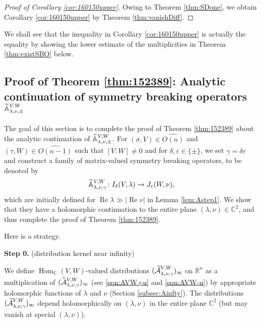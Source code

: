 \begin{proof}
[Proof of Corollary \ref{cor:160150upper}]
Owing to Theorem \ref{thm:SDone}, 
 we obtain Corollary \ref{cor:160150upper} by 
 Theorem \ref{thm:vanishDiff}.  
\end{proof}

We shall see 
 that the inequality in Corollary \ref{cor:160150upper}
 is actually the equality 
 by showing the lower estimate
 of the multiplicities in Theorem \ref{thm:existSBO}
 below.  
\subsection{Proof of Theorem \ref{thm:152389}: Analytic continuation of 
symmetry breaking operators
 ${\widetilde{\mathbb{A}}}_{{\lambda},{\nu},{\pm}}^{{V, W}}$}
\label{subsec:holoAVW}
The goal of this section
 is to complete the proof of Theorem \ref{thm:152389}
 about the analytic continuation of ${\widetilde{\mathbb{A}}}_{{\lambda},{\nu},{\pm}}^{{V,W}}$.  
For $(\sigma,V) \in \widehat {O(n)}$ and 
 $(\tau,W) \in \widehat{O(n-1)}$ such that $[V:W]\ne 0$
 and for $\delta, \varepsilon \in \{\pm\}$, 
 we set $\gamma =\delta \varepsilon$
 and construct a family
 of matrix-valued symmetry breaking operators,
 to be denoted by
\[
  {\widetilde{\mathbb{A}}}_{{\lambda},{\nu},{\gamma}}^{{V, W}} \colon
  I_{\delta}(V,\lambda) \to J_{\varepsilon}(W,\nu), 
\]
 which are initially defined
 for $\operatorname{Re} \lambda \gg |\operatorname{Re} \nu|$
 in Lemma \ref{lem:Astep1}.  
We show that they have a holomorphic continuation 
 to the entire plane $(\lambda, \nu) \in {\mathbb{C}}^2$, 
 and thus complete the proof of Theorem \ref{thm:152389}.  


\vskip 0.8pc
Here is a strategy.  
\par\noindent
{\bf{Step 0.}}
(distribution kernel near infinity)\enspace

We define ${\operatorname{Hom}}_{\mathbb{C}}(V,W)$-valued distributions
 $(\widetilde{{\mathcal{A}}}_{{\lambda},{\nu},{\gamma}}^{{V, W}})_{\infty}$
 on ${\mathbb{R}}^n$ as a multiplication 
 of $(\tilde{\tilde{{\mathcal{A}}}}_{{\lambda},{\nu},{\gamma}}^{{V, W}})_{\infty}$
 (see \eqref{eqn:AVW+u} and \eqref{eqn:AVW-u})
 by appropriate holomorphic functions
 of $\lambda$ and $\nu$
 (Section \ref{subsec:Ainfty}).  
The distributions $(\widetilde{{\mathcal{A}}}_{{\lambda},{\nu},{\gamma}}^{{V,W}})_{\infty}$ depend holomorphically
 on $(\lambda,\nu)$ in the entire plane ${\mathbb{C}}^2$
 (but may vanish at special $(\lambda,\nu)$).  


